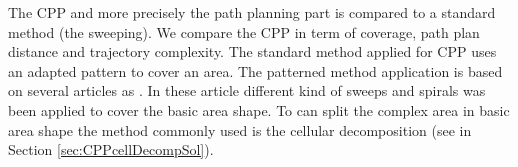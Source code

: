 The CPP and more precisely the path planning part is compared to a standard method (the sweeping). We compare the CPP  in term of coverage, path plan distance and trajectory complexity.
 The standard method applied for CPP uses an adapted pattern to cover an area. The patterned method application is based on several articles as \citep{144*torres2016,191*di2016,63*chao2008,66*galceran2013,119*choset1998}. In these article different kind of sweeps and spirals was been applied to cover the basic area shape. To can split the complex area in basic area shape the method commonly used is the cellular decomposition (see in Section \ref{sec:CPPcellDecompSol}).  %


